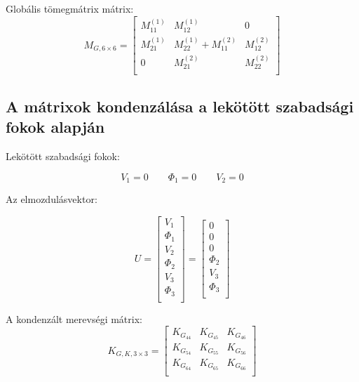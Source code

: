 \documentclass{article}
\begin{document}
			Globális tömegmátrix mátrix:
			\begin{equation}
				M_{G,6\times6}=
				\begin{bmatrix}
				M_{11}^{(1)} & M_{12}^{(1)}              & 0            \\
				M_{21}^{(1)} & M_{22}^{(1)}+M_{11}^{(2)} & M_{12}^{(2)} \\
				0            & M_{21}^{(2)}              & M_{22}^{(2)} \\
				\end{bmatrix}
			\end{equation}
	
	
		\subsection{A mátrixok kondenzálása a lekötött szabadsági fokok alapján}
		
			Lekötött szabadsági fokok:
			
			\[V_{1}=0 \qquad \Phi_{1}=0 \qquad V_{2}=0\]	
			
			Az elmozdulásvektor:
			
			\begin{equation}
				U=
				\begin{bmatrix}
				V_{1}    \\
				\Phi_{1} \\
				V_{2}    \\
				\Phi_{2} \\
				V_{3}    \\
				\Phi_{3} \\
				\end{bmatrix}
				=
				\begin{bmatrix}
				0  \\
				0 \\
				0    \\
				\Phi_{2} \\
				V_{3}    \\
				\Phi_{3} \\
				\end{bmatrix}
			\end{equation}
			
			A kondenzált merevségi mátrix: 
			\begin{equation}
				K_{G,K,3\times3}=
				\begin{bmatrix}
				K_{G_{44}}	 & K_{G_{45}}	 & K_{G_{46}}   \\
				K_{G_{54}}	 & K_{G_{55}}	 & K_{G_{56}}   \\
				K_{G_{64}}	 & K_{G_{65}}	 & K_{G_{66}}   \\
				\end{bmatrix}
			\end{equation}
			
\end{document}
